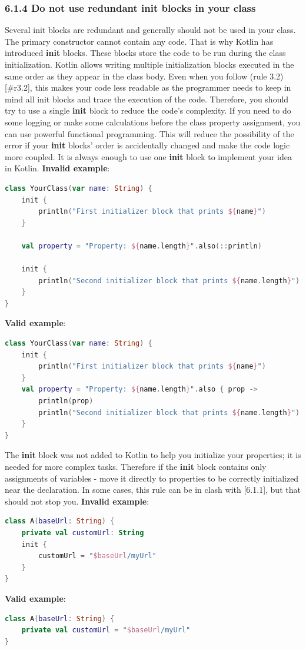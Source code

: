 \subsubsection*{\textbf{6.1.4 Do not use redundant init blocks in your class}}
\leavevmode\newline
\label{sec:6.1.4}
Several init blocks are redundant and generally should not be used in your class. The primary constructor cannot contain any code. That is why Kotlin has introduced \textbf{init} blocks.
These blocks store the code to be run during the class initialization.
Kotlin allows writing multiple initialization blocks executed in the same order as they appear in the class body.
Even when you follow (rule 3.2)[\#r3.2], this makes your code less readable as the programmer needs to keep in mind all init blocks and trace the execution of the code.
Therefore, you should try to use a single \textbf{init} block to reduce the code's complexity. If you need to do some logging or make some calculations before the class property assignment, you can use powerful functional programming. This will reduce the possibility of the error if your \textbf{init} blocks' order is accidentally changed and
make the code logic more coupled. It is always enough to use one \textbf{init} block to implement your idea in Kotlin.
\textbf{Invalid example}:
\begin{lstlisting}[language=Kotlin]
class YourClass(var name: String) {
    init {
        println("First initializer block that prints ${name}")
    }

    val property = "Property: ${name.length}".also(::println)

    init {
        println("Second initializer block that prints ${name.length}")
    }
}
\end{lstlisting}
\textbf{Valid example}:
\begin{lstlisting}[language=Kotlin]
class YourClass(var name: String) {
    init {
        println("First initializer block that prints ${name}")
    }
    val property = "Property: ${name.length}".also { prop ->
        println(prop)
        println("Second initializer block that prints ${name.length}")
    }
}
\end{lstlisting}
The \textbf{init} block was not added to Kotlin to help you initialize your properties; it is needed for more complex tasks.
Therefore if the \textbf{init} block contains only assignments of variables - move it directly to properties to be correctly initialized near the declaration.
In some cases, this rule can be in clash with [6.1.1], but that should not stop you.
\textbf{Invalid example}:
\begin{lstlisting}[language=Kotlin]
class A(baseUrl: String) {
    private val customUrl: String
    init {
        customUrl = "$baseUrl/myUrl"
    }
}
\end{lstlisting}
\textbf{Valid example}:
\begin{lstlisting}[language=Kotlin]
class A(baseUrl: String) {
    private val customUrl = "$baseUrl/myUrl"
}
\end{lstlisting}

